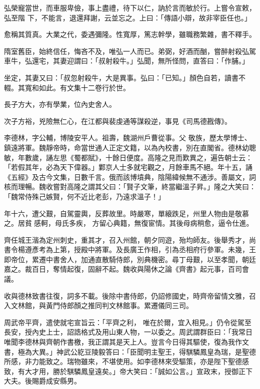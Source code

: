 \begin{pinyinscope}
 弘榮寵當世，而車服卑儉，事上盡禮，待下以仁，訥於言而敏於行。上嘗令宣敕，弘至階
 下，不能言，退還拜謝，云並忘之。上曰：「傳語小辯，故非宰臣任也。」



 愈稱其質真。大業之代，委遇彌隆。性寬厚，篤志幹學，雖職務繁雜，書不釋手。



 隋室舊臣，始終信任，悔吝不及，唯弘一人而已。弟弼，好酒而酗，嘗醉射殺弘駕車牛，弘還宅，其妻迎謂曰：「叔射殺牛。」弘聞，無所怪問，直答曰：「作脯。」



 坐定，其妻又曰：「叔忽射殺牛，大是異事。弘曰：「已知。」顏色自若，讀書不輟。其寬和如此。有文集十二卷行於世。



 長子方大，亦有學業，位內史舍人。



 次子方裕，兇險無仁心，在江都與裴虔通等謀殺逆，事見《司馬德戡傳》。



 李德林，字公輔，博陵安平人。祖壽，魏湖州戶曹從事。父
 敬族，歷太學博士、鎮遠將軍。魏靜帝時，命當世通人正定文籍，以為內校書，別在直閣省。德林幼聰敏，年數歲，誦左思《蜀都賦》，十餘日便度。高隆之見而歎異之，遍告朝士云：「若假其年，必為天下偉器。」鄴京人士多就宅觀之，月餘車馬不絕。年十五，誦《五經》及古今文集，日數千言。俄而該博墳典，陰陽緯候無不通涉。善屬文，詞核而理暢。魏收嘗對高隆之謂其父曰：「賢子文筆，終當繼溫子昇。」隆之大笑曰：「魏常侍殊己嫉賢，何不近比老彭，乃遠求溫子！」



 年十六，遭父艱，自駕靈輿，反葬故里。時嚴寒，單縗跌足，州里人物由是敬慕之。居貧感軻，母氏多疾，
 方留心典籍，無復宦情。其後母病稍愈，逼令仕進。



 齊任城王湝為定州刺史，重其才，召入州館，朝夕同遊，殆均師友。後舉秀才，尚書令楊遵彥考為上第，授殿中將軍。及長廣王作相，引為丞相府行參軍。未幾，王即帝位，累遷中書舍人，加通直散騎侍郎，別典機密。尋丁母艱，以至孝聞，朝廷嘉之。裁百日，奪情起復，固辭不起。魏收與陽休之論《齊書》起元事，百司會議。



 收與德林致書往復，詞多不載。後除中書侍郎，仍詔修國史，時齊帝留情文雅，召入文林館，與黃門侍郎顏之推同判文林館事。累遷儀同三司。



 周武帝平齊，遣使就宅宣旨云：「平齊之利，
 唯在於爾，宜入相見。」仍令從駕至長安，授內史上士，詔誥格式及用山東人物，一以委之。周武謂群臣曰：「我常日唯聞李德林與齊朝作書檄，我正謂其是天上人。豈言今日得其驅使，復為我作文書，極為大異。」神武公紇豆陵毅答曰：「臣聞明主聖王，得騏驎鳳皇為瑞，是聖德所感，非力能致之。瑞物雖來，不堪使用。如李德林來受驅策，亦是陛下聖德感致，有大才用，勝於騏驎鳳皇遠矣。」帝大笑曰：「誠如公言。」宣政末，授御正下大夫。後賜爵成安縣男。




\end{pinyinscope}
